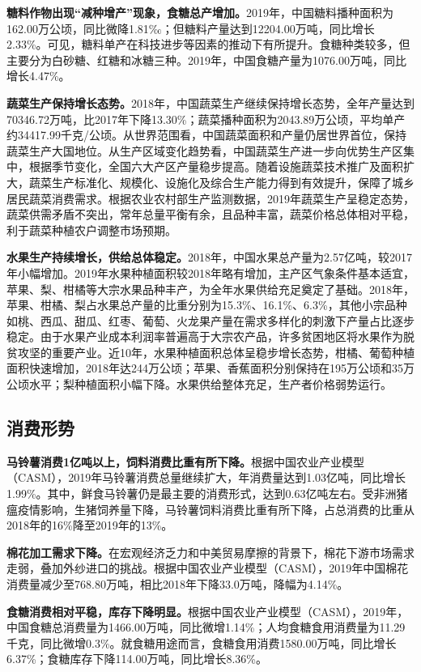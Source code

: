 \documentclass{progbookcn}
\begin{document}
\textbf{糖料作物出现“减种增产”现象，食糖总产增加。}2019年，中国糖料播种面积为162.00万公顷，同比微降1.81‰；但糖料产量达到12204.00万吨，同比增长2.33\%。可见，糖料单产在科技进步等因素的推动下有所提升。食糖种类较多，但主要分为白砂糖、红糖和冰糖三种。2019年，中国食糖产量为1076.00万吨，同比增长4.47\%。

\textbf{蔬菜生产保持增长态势。}2018年，中国蔬菜生产继续保持增长态势，全年产量达到70346.72万吨，比2017年下降13.30\%；蔬菜播种面积为2043.89万公顷，平均单产约34417.99千克/公顷。从世界范围看，中国蔬菜面积和产量仍居世界首位，保持蔬菜生产大国地位。从生产区域变化趋势看，中国蔬菜生产进一步向优势生产区集中，根据季节变化，全国六大产区产量稳步提高。随着设施蔬菜技术推广及面积扩大，蔬菜生产标准化、规模化、设施化及综合生产能力得到有效提升，保障了城乡居民蔬菜消费需求。根据农业农村部生产监测数据，2019年蔬菜生产呈稳定态势，蔬菜供需矛盾不突出，常年总量平衡有余，且品种丰富，蔬菜价格总体相对平稳，利于蔬菜种植农户调整市场预期。

\textbf{水果生产持续增长，供给总体稳定。}2018年，中国水果总产量为2.57亿吨，较2017年小幅增加。2019年水果种植面积较2018年略有增加，主产区气象条件基本适宜，苹果、梨、柑橘等大宗水果品种丰产，为全年水果供给充足奠定了基础。2018年，苹果、柑橘、梨占水果总产量的比重分别为15.3\%、16.1\%、6.3\%，其他小宗品种如桃、西瓜、甜瓜、红枣、葡萄、火龙果产量在需求多样化的刺激下产量占比逐步稳定。由于水果产业成本利润率普遍高于大宗农产品，许多贫困地区将水果作为脱贫攻坚的重要产业。近10年，水果种植面积总体呈稳步增长态势，柑橘、葡萄种植面积快速增加，2018年达244万公顷；苹果、香蕉面积分别保持在195万公顷和35万公顷水平；梨种植面积小幅下降。水果供给整体充足，生产者价格弱势运行。

\subsection{消费形势}
\textbf{马铃薯消费1亿吨以上，饲料消费比重有所下降。}根据中国农业产业模型（CASM），2019年马铃薯消费总量继续扩大，年消费量达到1.03亿吨，同比增长1.99\%。其中，鲜食马铃薯仍是最主要的消费形式，达到0.63亿吨左右。受非洲猪瘟疫情影响，生猪饲养量下降，马铃薯饲料消费比重有所下降，占总消费的比重从2018年的16\%降至2019年的13\%。

\textbf{棉花加工需求下降。}在宏观经济乏力和中美贸易摩擦的背景下，棉花下游市场需求走弱，叠加外纱进口的挑战。根据中国农业产业模型（CASM），2019年中国棉花消费量减少至768.80万吨，相比2018年下降33.0万吨，降幅为4.14\%。

\textbf{食糖消费相对平稳，库存下降明显。}根据中国农业产业模型（CASM），2019年，中国食糖总消费量为1466.00万吨，同比微增1.14\%；人均食糖食用消费量为11.29千克，同比微增0.3\%。就食糖用途而言，食糖食用消费1580.00万吨，同比增长6.37\%；食糖库存下降114.00万吨，同比增长8.36\%。
\end{document}
